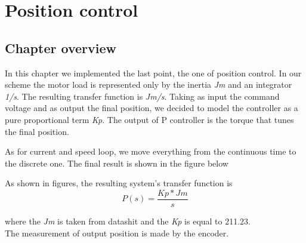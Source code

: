 \documentclass[12pt]{article}
\begin{document}
\section{Position control}
\subsection{Chapter overview}
In this chapter we implemented the last point, the one of position control.
In our scheme the motor load is represented only by the inertia \textit{Jm} and an integrator \textit{1/s}. The resulting transfer function is \textit{Jm/s}.
Taking as input the command voltage and as output the final position, we decided to model the controller as a pure proportional term \textit{Kp}.
The output of P controller is the torque that tunes the final position. 

As for current and speed loop, we move everything from the continuous time to the discrete one. The final result is shown in the figure below


As shown in figures, the resulting system's transfer function is
\begin{equation}
P(s) = \dfrac{Kp*Jm}{s}
\end{equation}

where the \textit{Jm} is taken from datashit and the \textit{Kp} is equal to 211.23.\\
The measurement of output position is made by the encoder.
\end{document}

